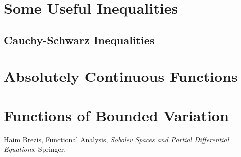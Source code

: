 \documentclass[a4paper,oneside]{book}
\numberwithin{equation}{chapter}
\begin{document}
\section{Some Useful Inequalities}
\subsection{Cauchy-Schwarz Inequalities}






\section{Absolutely Continuous Functions}


























\section{Functions of Bounded Variation}
















\newpage
\printindex
\newpage
\begin{thebibliography}{999}
 Haim Brezis, Functional Analysis, \textit{Sobolev Spaces and Partial Differential Equations}, Springer.
\end{thebibliography}
\end{document}
